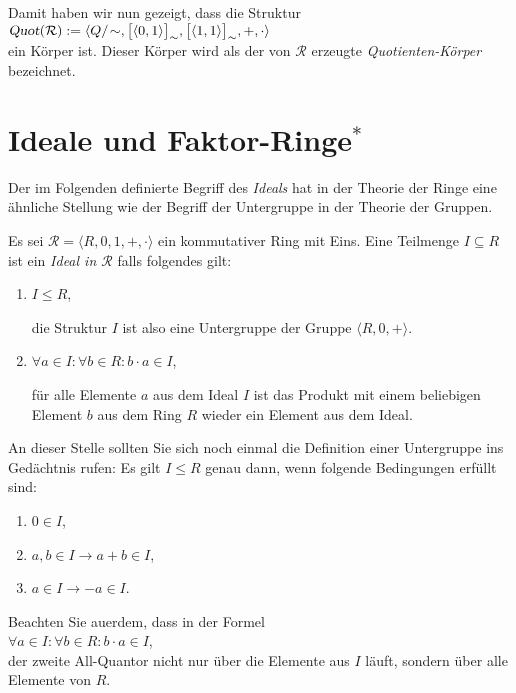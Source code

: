 Damit haben wir nun gezeigt, dass die Struktur
\\[0.2cm]
\hspace*{1.3cm}
$\textsl{Quot}(\mathcal{R}) := \langle Q/\!\sim, \bpr(0,1), \bpr(1,1), +, \cdot \rangle$ 
\\[0.2cm]
ein K\"{o}rper ist.  Dieser K\"{o}rper wird als der von $\mathcal{R}$ erzeugte \emph{Quotienten-K\"{o}rper} bezeichnet.


\section{Ideale und Faktor-Ringe$^*$}
Der im Folgenden definierte Begriff des \emph{Ideals} hat in der Theorie der Ringe eine \"{a}hnliche
Stellung wie der Begriff der Untergruppe in der Theorie der Gruppen.
\begin{Definition}[Ideal]
Es sei $\mathcal{R} = \langle R, 0, 1, +, \cdot \rangle$ ein kommutativer Ring mit Eins.
Eine Teilmenge $I \subseteq R$ ist ein {\color{blue}\emph{Ideal in $\mathcal{R}$}} falls folgendes gilt:
\begin{enumerate}
\item $I \leq R$,

      die Struktur $I$ ist also eine Untergruppe der Gruppe $\langle R, 0, + \rangle$.
\item $\forall a \in I: \forall b \in R: b \cdot a \in I$,

      f\"{u}r alle Elemente $a$ aus dem Ideal $I$ ist das Produkt mit einem beliebigen Element
      $b$ aus dem Ring $R$ wieder ein Element aus dem Ideal. \eox
\end{enumerate}
\end{Definition}

\remark
An dieser Stelle sollten Sie sich noch einmal die Definition einer Untergruppe ins
Ged\"{a}chtnis rufen:  Es gilt $I \leq R$ genau
dann, wenn folgende Bedingungen erf\"{u}llt sind:
\begin{enumerate}
\item $0 \in I$,
\item $a,b \in I \rightarrow a + b \in I$,
\item $a \in I \rightarrow -a \in I$.
\end{enumerate}
Beachten Sie au\3erdem, dass in der Formel 
\\[0.2cm]
\hspace*{1.3cm}
$\forall a \in I: \forall b \in R: b \cdot a \in I$,
\\[0.2cm]
der zweite All-Quantor nicht nur \"{u}ber die Elemente aus $I$ l\"{a}uft, sondern \"{u}ber alle Elemente
von $R$.  \eox
\pagebreak

